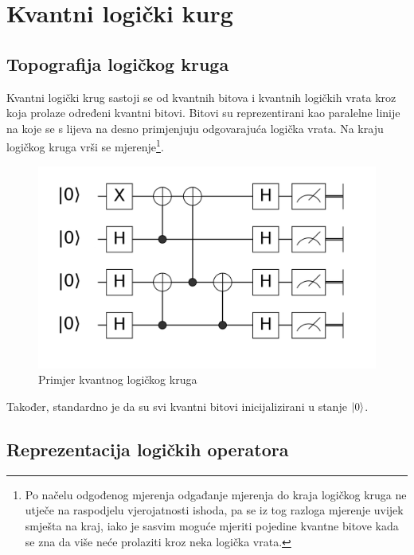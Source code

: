 \section{Kvantni logički kurg}

\subsection{Topografija logičkog kruga}

Kvantni logički krug sastoji se od kvantnih bitova i kvantnih logičkih vrata kroz koja prolaze određeni kvantni bitovi. Bitovi su reprezentirani kao paralelne linije na koje se s lijeva na desno primjenjuju odgovarajuća logička vrata. Na kraju logičkog kruga vrši se mjerenje\footnote{Po načelu odgođenog mjerenja  odgađanje mjerenja do kraja logičkog kruga ne utječe na raspodjelu vjerojatnosti ishoda, pa se iz tog razloga mjerenje uvijek smješta na kraj, iako je sasvim moguće mjeriti pojedine kvantne bitove kada se zna da više neće prolaziti kroz neka logička vrata.}.
\begin{figure}[H]
\centering
\includegraphics[scale=0.2]{img/exampleqc.png}
\caption{Primjer kvantnog logičkog kruga} 
\end{figure}
Također, standardno je da su svi kvantni bitovi inicijalizirani u stanje $\ket{0}$.

\subsection{Reprezentacija logičkih operatora}

